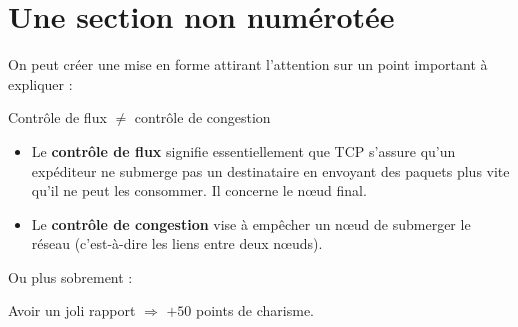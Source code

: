 \section*{Une section non numérotée}
On peut créer une mise en forme attirant l'attention sur un point important à expliquer :

\begin{callout}{Contrôle de flux $\neq$ contrôle de congestion}
    \begin{itemize}
        \item Le \textbf{contrôle de flux} signifie essentiellement que TCP s'assure qu'un expéditeur ne submerge pas un destinataire en envoyant des paquets plus vite qu'il ne peut les consommer. Il concerne le nœud final.
        \item Le \textbf{contrôle de congestion} vise à empêcher un nœud de submerger le réseau (c'est-à-dire les liens entre deux nœuds).
    \end{itemize}
\end{callout}

Ou plus sobrement :

\begin{myboxedtext}
    Avoir un joli rapport $\Rightarrow$ $+50$ points de charisme.
\end{myboxedtext}